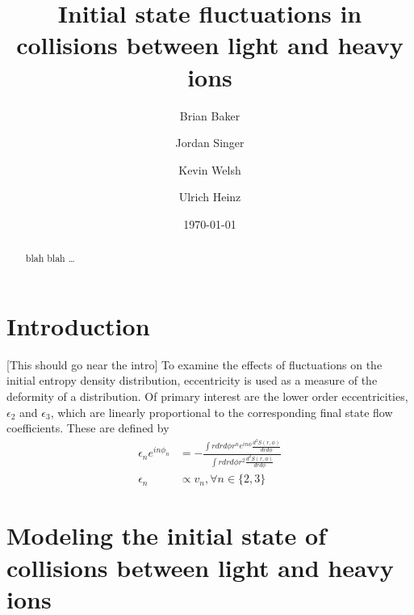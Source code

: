 \documentclass[preprint,showpacs,amsfonts,aps,prl,nofootinbib,floatfix]{revtex4}
\begin{document}

\title{Initial state fluctuations in collisions between light and heavy ions} 


\author{Brian Baker}
\author{Jordan Singer}
\author{Kevin Welsh}
\author{Ulrich Heinz}
  
\begin{abstract}
blah blah \dots
\end{abstract}


\date{\today}

\maketitle


\section{Introduction}
\label{sec1}

[This should go near the intro]
To examine the effects of fluctuations on the initial entropy density distribution, eccentricity is used as a measure of the deformity of a distribution. Of primary interest are the lower order eccentricities, $\epsilon_2$ and $\epsilon_3$, which are linearly proportional to the corresponding final state flow coefficients. These are defined by
\begin{align}
\epsilon_n e^{i n\phi_n}& = -\frac{\int r dr d\phi r^n e^{i n \phi} \frac{d^2 S(r,\phi)}{dr d\phi}}{\int r dr d\phi r^2 \frac{d^2 S(r,\phi)}{dr d\phi}}\\
\epsilon_n &\propto v_n, \forall n \in \{2,3\}
\end{align}

\section{Modeling the initial state of collisions between light and heavy ions}
\label{sec2}
\end{document}
